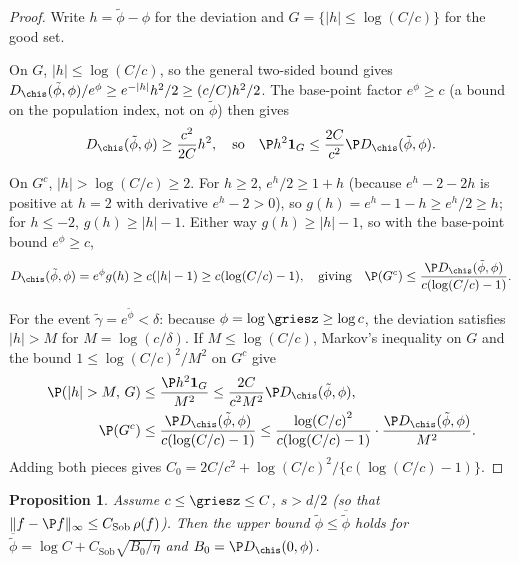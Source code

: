 \documentclass{article}
\newtheorem{proposition}[theorem]{Proposition}
\begin{document}
\begin{proof}
Write $h = \tilde\phi - \phi$ for the deviation and $G = \{|h| \le \log(C/c)\}$ for the good set.

On $G$, $|h| \le \log(C/c)$, so the general two-sided bound gives $D_{\chis}(\tilde\phi, \phi)/e^\phi \ge e^{-|h|} h^2/2 \ge (c/C) h^2/2$. The base-point factor $e^\phi \ge c$ (a bound on the population index, not on $\tilde\phi$) then gives
\[
D_{\chis}(\tilde\phi, \phi) \ge \frac{c^2}{2C} h^2, \quad\text{so}\quad
\P h^2 \mathbf{1}_G \le \frac{2C}{c^2} \P D_{\chis}(\tilde\phi, \phi).
\]

On $G^c$, $|h| > \log(C/c) \ge 2$. For $h \ge 2$, $e^h/2 \ge 1 + h$ (because $e^h - 2 - 2h$ is positive at $h = 2$ with derivative $e^h - 2 > 0$), so $g(h) = e^h - 1 - h \ge e^h/2 \ge h$; for $h \le -2$, $g(h) \ge |h| - 1$. Either way $g(h) \ge |h| - 1$, so with the base-point bound $e^\phi \ge c$,
\[
D_{\chis}(\tilde\phi, \phi) = e^\phi g(h) \ge c(|h| - 1) \ge c(\log(C/c) - 1), \quad\text{giving}\quad
\P(G^c) \le \frac{\P D_{\chis}(\tilde\phi, \phi)}{c(\log(C/c) - 1)}.
\]

For the event $\tilde\gamma = e^{\tilde\phi} < \delta$: because $\phi = \log \griesz \ge \log c$, the deviation satisfies $|h| > M$ for $M = \log(c/\delta)$. If $M \le \log(C/c)$, Markov's inequality on $G$ and the bound $1 \le \log(C/c)^2/M^2$ on $G^c$ give
\[
\begin{aligned}
\P(|h| > M, \, G) &\le \frac{\P h^2 \mathbf{1}_G}{M^2} \le \frac{2C}{c^2 M^2} \P D_{\chis}(\tilde\phi, \phi), \\
\P(G^c) &\le \frac{\P D_{\chis}(\tilde\phi, \phi)}{c(\log(C/c) - 1)} \le \frac{\log(C/c)^2}{c(\log(C/c) - 1)} \cdot \frac{\P D_{\chis}(\tilde\phi, \phi)}{M^2}.
\end{aligned}
\]
Adding both pieces gives $C_0 = 2C/c^2 + \log(C/c)^2/\{c(\log(C/c) - 1)\}$.
\end{proof}

\begin{proposition}\label{prop:strict-overlap}
Assume $c \le \griesz \le C$, $s > d/2$ (so that $\|f - \P f\|_\infty \le C_{\mathrm{Sob}}\, \rho(f)$). Then the upper bound $\tilde\phi \le \overline{\tilde\phi}$ holds for $\overline{\tilde\phi} = \log C + C_{\mathrm{Sob}}\sqrt{B_0/\eta}$ and $B_0 = \P D_{\chis}(0, \phi)$.
\end{proposition}
\end{document}
